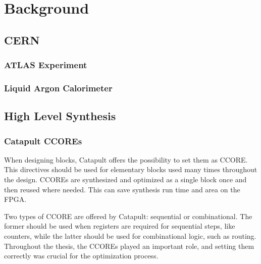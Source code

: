 \chapter{Background}\label{sec:background}
\parskip4pt \parindent12pt

\section{CERN}\label{sec:cern}

\subsection{ATLAS Experiment}\label{sec:atlas-experiment}

\subsection{Liquid Argon Calorimeter}\label{sec:liquid-argon-calorimeter}

\section{High Level Synthesis}\label{sec:high-level-synthesis}

\subsection{Catapult CCOREs}
When designing blocks, Catapult offers the possibility to set them as CCORE. This directives should be used for elementary blocks used many times throughout the design. CCOREs are synthesized and optimized as a single block once and then reused where needed. This can save synthesis run time and area on the FPGA.

Two types of CCORE are offered by Catapult: sequential or combinational. The former should be used when registers are required for sequential steps, like counters, while the latter should be used for combinational logic, such as routing. Throughout the thesis, the CCOREs played an important role, and setting them correctly was crucial for the optimization process.
